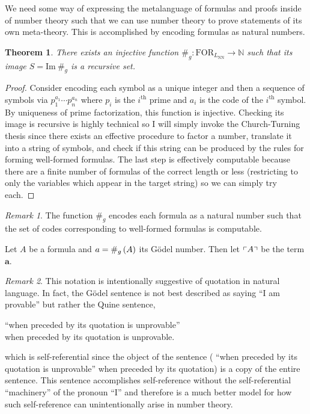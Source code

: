 \documentclass[12pt, leqno]{article}
\newcommand{\N}{\mathbb{N}}
\renewcommand{\bf}[1]{\mathbf{#1}}
\renewcommand{\Im}[1]{\mathrm{Im} \: #1}
\newcommand{\FOR}[1]{\mathrm{FOR}_{#1}}
\newenvironment{definition}[1][Definition:]{\begin{trivlist}
\item[\hskip \labelsep {\bfseries #1}]}{\end{trivlist}}
\theoremstyle{theorem}
\newtheorem{theorem}{Theorem}[section]
\theoremstyle{definition}
\theoremstyle{definition}
\theoremstyle{remark}
\theoremstyle{definition}
\theoremstyle{remark}
\newtheorem{remark}{Remark}[subsection]
\begin{document}
We need some way of expressing the metalanguage of formulas and proofs inside of number theory such that we can use number theory to prove statements of its own meta-theory. This is accomplished by encoding formulas as natural numbers. 

\begin{theorem}
There exists an injective function $\#_g : \FOR{L_{\mathrm{NN}}} \to \N$ such that its image $S = \Im{\#_g}$ is a recursive set. 
\end{theorem}

\begin{proof}
Consider encoding each symbol as a unique integer and then a sequence of symbols via $p_1^{a_1} \cdots p_n^{a_n}$ where $p_i$ is the $i^{\text{th}}$ prime and $a_i$ is the code of the $i^{\text{th}}$ symbol. By uniqueness of prime factorization, this function is injective. Checking its image is recursive is highly technical so I will simply invoke the Church-Turning thesis since there exists an effective procedure to factor a number, translate it into a string of symbols, and check if this string can be produced by the rules for forming well-formed formulas. The last step is effectively computable because there are a finite number of formulas of the correct length or less (restricting to only the variables which appear in the target string) so we can simply try each. 
\end{proof}

\begin{remark}
The function $\#_g$ encodes each formula as a natural number such that the set of codes corresponding to well-formed formulas is computable. 
\end{remark}

\begin{definition}
Let $A$ be a formula and $a = \#_g\left( A \right)$ its G\"{o}del number. Then let $\left\ulcorner A \right\urcorner$ be the term $\bf{a}$. 
\end{definition}

\begin{remark}
This notation is intentionally suggestive of quotation in natural language. In fact, the G\"{o}del sentence is not best described as saying ``I am provable'' but rather the Quine sentence,
\begin{center}
``when preceded by its quotation is unprovable'' \\
when preceded by its quotation is unprovable.
\end{center}
which is self-referential since the object of the sentence ( ``when preceded by its quotation is unprovable'' when preceded by its quotation) is a copy of the entire sentence. This sentence accomplishes self-reference without the self-referential ``machinery'' of the pronoun ``I'' and therefore is a much better model for how such self-reference can unintentionally arise in number theory. 
\end{remark}
\end{document}
